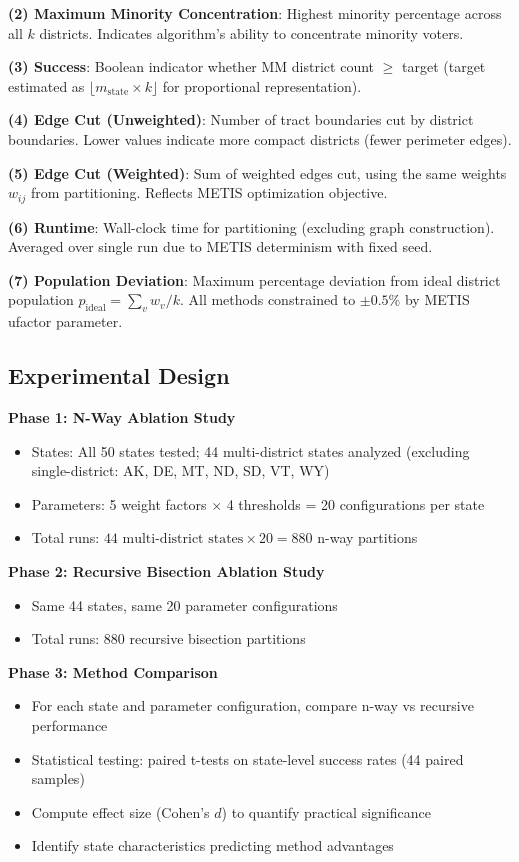 \textbf{(2) Maximum Minority Concentration}: Highest minority percentage across all $k$ districts. Indicates algorithm's ability to concentrate minority voters.

\textbf{(3) Success}: Boolean indicator whether MM district count $\geq$ target (target estimated as $\lfloor m_{\text{state}} \times k \rfloor$ for proportional representation).

\textbf{(4) Edge Cut (Unweighted)}: Number of tract boundaries cut by district boundaries. Lower values indicate more compact districts (fewer perimeter edges).

\textbf{(5) Edge Cut (Weighted)}: Sum of weighted edges cut, using the same weights $w_{ij}$ from partitioning. Reflects METIS optimization objective.

\textbf{(6) Runtime}: Wall-clock time for partitioning (excluding graph construction). Averaged over single run due to METIS determinism with fixed seed.

\textbf{(7) Population Deviation}: Maximum percentage deviation from ideal district population $p_{\text{ideal}} = \sum_v w_v / k$. All methods constrained to $\pm 0.5\%$ by METIS ufactor parameter.

\subsection{Experimental Design}

\textbf{Phase 1: N-Way Ablation Study}
\begin{itemize}
\item States: All 50 states tested; 44 multi-district states analyzed (excluding single-district: AK, DE, MT, ND, SD, VT, WY)
\item Parameters: 5 weight factors $\times$ 4 thresholds = 20 configurations per state
\item Total runs: $44 \text{ multi-district states} \times 20 = 880$ n-way partitions
\end{itemize}

\textbf{Phase 2: Recursive Bisection Ablation Study}
\begin{itemize}
\item Same 44 states, same 20 parameter configurations
\item Total runs: 880 recursive bisection partitions
\end{itemize}

\textbf{Phase 3: Method Comparison}
\begin{itemize}
\item For each state and parameter configuration, compare n-way vs recursive performance
\item Statistical testing: paired t-tests on state-level success rates (44 paired samples)
\item Compute effect size (Cohen's $d$) to quantify practical significance
\item Identify state characteristics predicting method advantages
\end{itemize}

